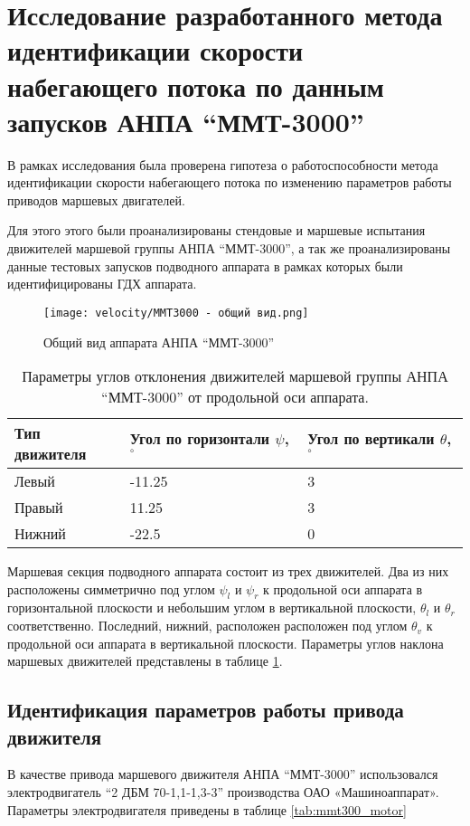 \section{Исследование разработанного метода идентификации скорости набегающего потока по данным запусков АНПА ``ММТ-3000''}
В рамках исследования была проверена гипотеза о работоспособности метода идентификации скорости набегающего потока по изменению параметров работы приводов маршевых двигателей.

Для этого этого были проанализированы стендовые и маршевые испытания движителей маршевой группы АНПА ``ММТ-3000'', а так же проанализированы данные тестовых запусков подводного аппарата в рамках которых были идентифицированы ГДХ аппарата.

\begin{figure}[ht]
    \centering
    \texttt{[image: velocity/MMT3000 - общий вид.png]}
    \caption{Общий вид аппарата АНПА ``ММТ-3000''}
    \label{fig:mmt-3000}
\end{figure}

\begin{table}
    \caption{Параметры углов отклонения движителей маршевой группы АНПА ``ММТ-3000'' от продольной оси аппарата.}
    \label{tab:mmt3000_propulsion_angles}
    \centering
    \begin{tabular}{lll}
        \toprule
        Тип движителя & Угол по горизонтали $\psi$, $^{\circ}$  & Угол по вертикали $\theta$, $^{\circ}$ \\
        \midrule
        Левый  & -11.25 & 3 \\
        Правый &  11.25 & 3 \\
        Нижний &  -22.5 & 0 \\
        \bottomrule
    \end{tabular}
\end{table}

Маршевая секция подводного аппарата состоит из трех движителей.
Два из них расположены симметрично под углом $\psi_l$ и $\psi_r$ к продольной оси аппарата в горизонтальной плоскости и небольшим углом в вертикальной плоскости, $\theta_l$ и $\theta_r$ соответственно.
Последний, нижний, расположен расположен под углом $\theta_v$ к продольной оси аппарата в вертикальной плоскости.
Параметры углов наклона маршевых движителей представлены в таблице \ref{tab:mmt3000_propulsion_angles}.

\subsection{Идентификация параметров работы привода движителя}
В качестве привода маршевого движителя АНПА ``ММТ-3000'' использовался электродвигатель ``2 ДБМ 70-1,1-1,3-3'' производства ОАО «Машиноаппарат».
Параметры электродвигателя приведены в таблице \ref{tab:mmt300_motor}

